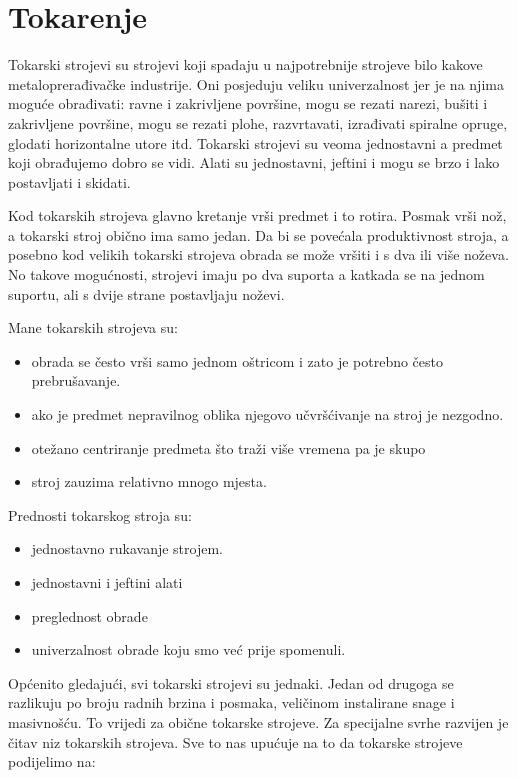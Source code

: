\documentclass[a4paper,12pt]{article}
\numberwithin{figure}{section}
\begin{document}
\section{Tokarenje}
Tokarski strojevi su strojevi koji spadaju u najpotrebnije strojeve bilo kakove metaloprerađivačke industrije. Oni posjeduju veliku univerzalnost jer je na njima moguće obrađivati: ravne i zakrivljene površine, mogu se rezati narezi, bušiti i zakrivljene površine, mogu se rezati plohe, razvrtavati, izrađivati spiralne opruge, glodati horizontalne utore itd. Tokarski strojevi su veoma jednostavni a predmet koji obrađujemo dobro se vidi. Alati su jednostavni, jeftini i mogu se brzo i lako postavljati i skidati.\par
Kod tokarskih strojeva glavno kretanje vrši predmet i to rotira. Posmak vrši nož, a tokarski stroj obično ima samo jedan. Da bi se povećala produktivnost stroja, a posebno kod velikih tokarski strojeva obrada se može vršiti i s dva ili više noževa. No takove mogućnosti, strojevi imaju po dva suporta a katkada se na jednom suportu, ali s dvije strane postavljaju noževi.\par 
Mane tokarskih strojeva su:
\begin{itemize}
\item obrada se često vrši samo jednom oštricom i zato je potrebno često prebrušavanje.
\item ako je predmet nepravilnog oblika njegovo učvršćivanje na stroj je nezgodno.
\item otežano centriranje predmeta što traži više vremena pa je skupo
\item stroj zauzima relativno mnogo mjesta.
\end{itemize}
\par
Prednosti tokarskog stroja su:
\begin{itemize}
\item jednostavno rukavanje strojem.
\item jednostavni i jeftini alati
\item preglednost obrade
\item univerzalnost obrade koju smo već prije spomenuli.
\end{itemize}
\par
Općenito gledajući, svi tokarski strojevi su jednaki. Jedan od drugoga se razlikuju po broju radnih brzina i posmaka, veličinom instalirane snage i masivnošću. To vrijedi za obične tokarske strojeve. Za specijalne svrhe razvijen je čitav niz tokarskih strojeva. Sve to nas upućuje na to da tokarske strojeve podijelimo na:
\end{document}
